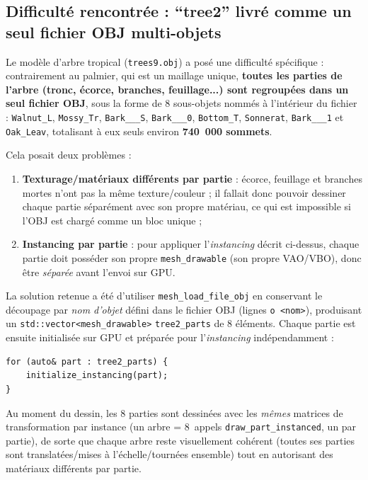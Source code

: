 \documentclass[11pt,a4paper]{article}
\begin{document}
\subsection{Difficulté rencontrée : ``tree2'' livré comme un seul
fichier OBJ multi-objets}

Le modèle d'arbre tropical (\texttt{trees9.obj}) a posé une difficulté
spécifique : contrairement au palmier, qui est un maillage unique,
\textbf{toutes les parties de l'arbre (tronc, écorce, branches,
feuillage...) sont regroupées dans un seul fichier OBJ}, sous la forme
de 8 sous-objets nommés à l'intérieur du fichier :
\texttt{Walnut\_L}, \texttt{Mossy\_Tr}, \texttt{Bark\_\_\_S},
\texttt{Bark\_\_\_0}, \texttt{Bottom\_T}, \texttt{Sonnerat},
\texttt{Bark\_\_\_1} et \texttt{Oak\_Leav}, totalisant à eux seuls
environ \textbf{740~000 sommets}.

Cela posait deux problèmes :
\begin{enumerate}
    \item \textbf{Texturage/matériaux différents par partie} : écorce,
    feuillage et branches mortes n'ont pas la même texture/couleur ; il
    fallait donc pouvoir dessiner chaque partie séparément avec son
    propre matériau, ce qui est impossible si l'OBJ est chargé comme un
    bloc unique ;
    \item \textbf{Instancing par partie} : pour appliquer
    l'\emph{instancing} décrit ci-dessus, chaque partie doit posséder
    son propre \texttt{mesh\_drawable} (son propre VAO/VBO), donc être
    \emph{séparée} avant l'envoi sur GPU.
\end{enumerate}

La solution retenue a été d'utiliser \texttt{mesh\_load\_file\_obj}
en conservant le découpage par \emph{nom d'objet} défini dans le
fichier OBJ (lignes \texttt{o <nom>}), produisant un
\texttt{std::vector<mesh\_drawable>}
\texttt{tree2\_parts} de 8 éléments. Chaque partie est ensuite
initialisée sur GPU et préparée pour l'\emph{instancing}
indépendamment :
\begin{lstlisting}
for (auto& part : tree2_parts) {
    initialize_instancing(part);
}
\end{lstlisting}
Au moment du dessin, les 8 parties sont dessinées avec les
\emph{mêmes} matrices de transformation par instance (un arbre =
8~appels \texttt{draw\_part\_instanced}, un par partie), de sorte que
chaque arbre reste visuellement cohérent (toutes ses parties sont
translatées/mises à l'échelle/tournées ensemble) tout en autorisant des
matériaux différents par partie.
\end{document}

